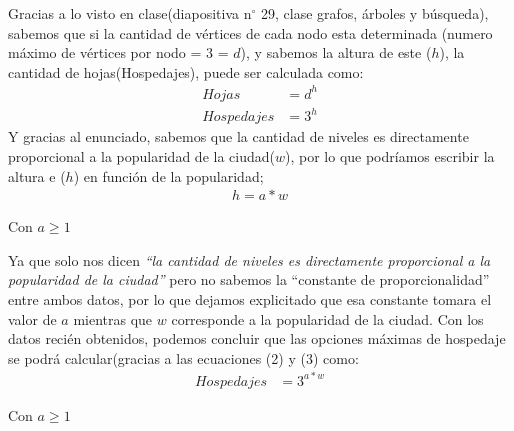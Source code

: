 \documentclass[letterpaper,10pt]{article}
\begin{document}
\begin{enumerate}[a)]
Gracias a lo visto en clase(diapositiva n$^{\circ}$ 29, clase grafos, árboles y búsqueda), sabemos que si la cantidad de vértices de cada nodo esta determinada (numero máximo de vértices por nodo = 3 = $d$), y sabemos la altura de este ($h$), la cantidad de hojas(Hospedajes), puede ser calculada como:
\begin{align}
    Hojas &= d^{h}\\
    Hospedajes &= 3^{h}
\end{align}
Y gracias al enunciado, sabemos que la cantidad de niveles es directamente proporcional a la popularidad de la ciudad($w$), por lo que podríamos escribir la altura e ($h$) en función de la popularidad;
\begin{align}
    h = a*w
\end{align}
\begin{center}
Con $a \geq 1$
\end{center}
Ya que solo nos dicen \textit{``la cantidad de niveles es directamente proporcional a la popularidad de la ciudad''} pero no sabemos la ``constante de proporcionalidad'' entre ambos datos, por lo que dejamos explicitado que esa constante tomara el valor de $a$ mientras que $w$ corresponde a la popularidad de la ciudad. Con los datos recién obtenidos, podemos concluir que las opciones máximas de hospedaje se podrá calcular(gracias a las ecuaciones (2) y (3) como:
\begin{align}
    Hospedajes &= 3^{a*w}
\end{align}
\begin{center}
Con $a \geq 1$
\end{center}
\end{enumerate}

\vfill
\end{document}
